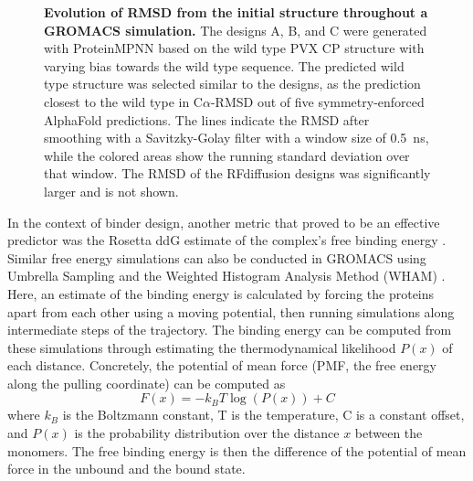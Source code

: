 \begin{figure}
    
    \caption{\textbf{Evolution of RMSD from the initial structure throughout a GROMACS simulation. } The designs A, B, and C were generated with ProteinMPNN based on the wild type PVX CP structure with varying bias towards the wild type sequence. The predicted wild type structure was selected similar to the designs, as the prediction closest to the wild type in C$\alpha$-RMSD out of five symmetry-enforced AlphaFold predictions. The lines indicate the RMSD after smoothing with a Savitzky-Golay filter with a window size of \SI{0.5}{\nano\second}, while the colored areas show the running standard deviation over that window. The RMSD of the RFdiffusion designs was significantly larger and is not shown. }
    \label{fig:gromacs_rmsd_gyrate}
\end{figure}

In the context of binder design, another metric that proved to be an effective predictor was the Rosetta ddG estimate of the complex's free binding energy \cite{physics_binder_design}. Similar free energy simulations can also be conducted in GROMACS using Umbrella Sampling and the Weighted Histogram Analysis Method (WHAM) \cite{wham_method}. Here, an estimate of the binding energy is calculated by forcing the proteins apart from each other using a moving potential, then running simulations along intermediate steps of the trajectory. The binding energy can be computed from these simulations through estimating the thermodynamical likelihood $P(x)$ of each distance. Concretely, the potential of mean force (PMF, the free energy along the pulling coordinate) can be computed as 
\begin{equation}
    F(x) = -k_B T \log(P(x)) + C
\end{equation}
where $k_B$ is the Boltzmann constant, T is the temperature, C is a constant offset, and $P(x)$ is the probability distribution over the distance $x$ between the monomers. The free binding energy is then the difference of the potential of mean force in the unbound and the bound state. 

